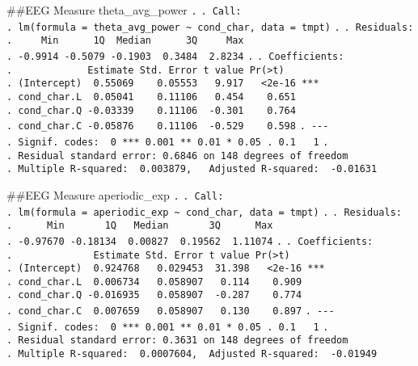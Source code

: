 \documentclass[
]{article}
\begin{document}
\#\#EEG Measure theta\_avg\_power \texttt{.} \texttt{.\ Call:}
\texttt{.\ lm(formula\ =\ theta\_avg\_power\ \textasciitilde{}\ cond\_char,\ data\ =\ tmpt)}
\texttt{.} \texttt{.\ Residuals:}
\texttt{.\ \ \ \ \ Min\ \ \ \ \ \ 1Q\ \ Median\ \ \ \ \ \ 3Q\ \ \ \ \ Max}
\texttt{.\ -0.9914\ -0.5079\ -0.1903\ \ 0.3484\ \ 2.8234} \texttt{.}
\texttt{.\ Coefficients:}
\texttt{.\ \ \ \ \ \ \ \ \ \ \ \ \ Estimate\ Std.\ Error\ t\ value\ Pr(\textgreater{}\textbar{}t\textbar{})}
\texttt{.\ (Intercept)\ \ 0.55069\ \ \ \ 0.05553\ \ \ 9.917\ \ \ \textless{}2e-16\ ***}
\texttt{.\ cond\_char.L\ \ 0.05041\ \ \ \ 0.11106\ \ \ 0.454\ \ \ \ 0.651}
\texttt{.\ cond\_char.Q\ -0.03339\ \ \ \ 0.11106\ \ -0.301\ \ \ \ 0.764}
\texttt{.\ cond\_char.C\ -0.05876\ \ \ \ 0.11106\ \ -0.529\ \ \ \ 0.598}
\texttt{.\ -\/-\/-}
\texttt{.\ Signif.\ codes:\ \ 0\ \textquotesingle{}***\textquotesingle{}\ 0.001\ \textquotesingle{}**\textquotesingle{}\ 0.01\ \textquotesingle{}*\textquotesingle{}\ 0.05\ \textquotesingle{}.\textquotesingle{}\ 0.1\ \textquotesingle{}\ \textquotesingle{}\ 1}
\texttt{.}
\texttt{.\ Residual\ standard\ error:\ 0.6846\ on\ 148\ degrees\ of\ freedom}
\texttt{.\ Multiple\ R-squared:\ \ 0.003879,\ \ \ Adjusted\ R-squared:\ \ -0.01631}

\#\#EEG Measure aperiodic\_exp \texttt{.} \texttt{.\ Call:}
\texttt{.\ lm(formula\ =\ aperiodic\_exp\ \textasciitilde{}\ cond\_char,\ data\ =\ tmpt)}
\texttt{.} \texttt{.\ Residuals:}
\texttt{.\ \ \ \ \ \ Min\ \ \ \ \ \ \ 1Q\ \ \ Median\ \ \ \ \ \ \ 3Q\ \ \ \ \ \ Max}
\texttt{.\ -0.97670\ -0.18134\ \ 0.00827\ \ 0.19562\ \ 1.11074}
\texttt{.} \texttt{.\ Coefficients:}
\texttt{.\ \ \ \ \ \ \ \ \ \ \ \ \ \ Estimate\ Std.\ Error\ t\ value\ Pr(\textgreater{}\textbar{}t\textbar{})}
\texttt{.\ (Intercept)\ \ 0.924768\ \ \ 0.029453\ \ 31.398\ \ \ \textless{}2e-16\ ***}
\texttt{.\ cond\_char.L\ \ 0.006734\ \ \ 0.058907\ \ \ 0.114\ \ \ \ 0.909}
\texttt{.\ cond\_char.Q\ -0.016935\ \ \ 0.058907\ \ -0.287\ \ \ \ 0.774}
\texttt{.\ cond\_char.C\ \ 0.007659\ \ \ 0.058907\ \ \ 0.130\ \ \ \ 0.897}
\texttt{.\ -\/-\/-}
\texttt{.\ Signif.\ codes:\ \ 0\ \textquotesingle{}***\textquotesingle{}\ 0.001\ \textquotesingle{}**\textquotesingle{}\ 0.01\ \textquotesingle{}*\textquotesingle{}\ 0.05\ \textquotesingle{}.\textquotesingle{}\ 0.1\ \textquotesingle{}\ \textquotesingle{}\ 1}
\texttt{.}
\texttt{.\ Residual\ standard\ error:\ 0.3631\ on\ 148\ degrees\ of\ freedom}
\texttt{.\ Multiple\ R-squared:\ \ 0.0007604,\ \ Adjusted\ R-squared:\ \ -0.01949}
\end{document}
